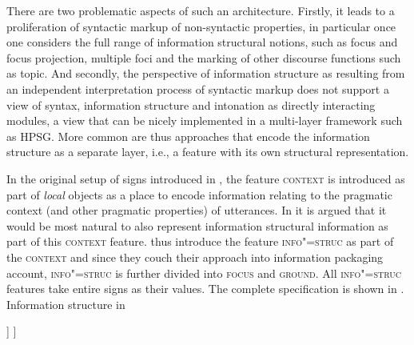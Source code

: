 \documentclass[output=paper
                ,modfonts
                ,nonflat
	        ,collection
	        ,collectionchapter
	        ,collectiontoclongg
 	        ,biblatex
                ,babelshorthands
                ,newtxmath
                ,draftmode
                ,colorlinks, citecolor=brown
]{./langsci/langscibook}
\begin{document}
There are two problematic aspects of such an architecture. Firstly, it
leads to a proliferation of syntactic markup of non-syntactic
properties, in particular once one considers the full range of
information structural notions, such as focus and focus projection,
multiple foci and the marking of other discourse functions such as
topic. And secondly, the perspective of information structure as
resulting from an independent interpretation process of syntactic
markup does not support a view of syntax, information structure and
intonation as directly interacting modules, a view that can be nicely
implemented in a multi-layer framework such as HPSG.
More common are thus approaches that encode the information structure
as a separate layer, i.e., a feature with its own structural
representation.

In the original setup of signs introduced in \cite{ps2}, the feature
\textsc{context} is introduced as part of \textit{local} objects as a
place to encode information relating to the pragmatic context (and
other pragmatic properties) of utterances. In \cite{EV96a} it is
argued that it would be most natural to also represent information
structural information as part of this \textsc{context}
feature. \cite{EV96a} thus introduce the feature \textsc{info"=struc}
as part of the \textsc{context} and since they couch their
approach into  information packaging account,
\textsc{info"=struc} is further divided into \textsc{focus} and
\textsc{ground}. All \textsc{info"=struc} features take entire signs as
their values. The complete specification is shown in
.
\ea \label{fig:e-v-info-struc}
Information structure in \cite[56]{EV96a}
        \leavevmode
    \begin{avm}
    [\tp{sign}\\
     synsem|local|context|info-struc & [focus & sign\\
                                        ground & [link & sign\\
                                                  tail & sign]
                                       ]
    ]     
    \end{avm}
\z
\end{document}
